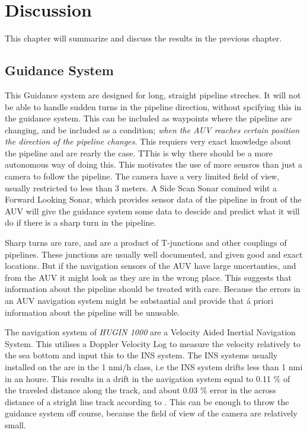 \chapter{Discussion}
	This chapter will summarize and discuss the results in the previous chapter.

\section{Guidance System}
	This Guidance system are designed for long, straight pipeline streches. It will not be able to handle
	sudden turns in the pipeline direction, without spcifying this in the guidance system. This can be
	included as waypoints where the pipeline are changing, and be included as a condition; \textit{when the AUV
	reaches certain position the direction of the pipeline changes}. This requiers very exact knowledge
	about the pipeline and are rearly the case. TThis is why there should be a more autonomous way of
	doing this. This motivates the use of more sensros than just a camera to follow the pipeline. The
	camera have a very limited field of view, usually restricted to less than 3 meters. A Side Scan Sonar
	comined wiht a Forward Looking Sonar, which provides sensor data of the pipeline in front of the AUV
	will give the guidance system some data to descide and predict what it will do if there is a sharp
	turn in the pipeline.

	Sharp turns are rare, and are a product of T-junctions and other couplings of pipelines. These
	junctions are usually well documented, and given good and exact locations. But if the navigation
	sensors of the AUV have large uncertanties, and from the AUV it might look as they are in the wrong
	place. This suggests that information about the pipeline should be treated with care. Because the
	errors in an AUV navigation system might be substantial and provide that \'a priori information about
	the pipeline will be unusable. 

	The navigation system of \textit{HUGIN 1000} are a Velocity Aided Inertial Navigation System. This
	utilises a Doppler Velocity Log to measure the velocity relatively to the sea bottom and input this to
	the INS system. The INS systems usually installed on the \hugin are in the 1 nmi/h class, i.e
	the INS system drifts less than 1 nmi in an houre. This results in a drift in the navigation system equal to
	0.11 \% of the traveled distance along the track, and about 0.03 \% error in the across distance of a
	stright line track according to \cite{INS_Hugin}. This can be enough to throw the guidance system off course,
	because the field of view of the camera are relatively small.

